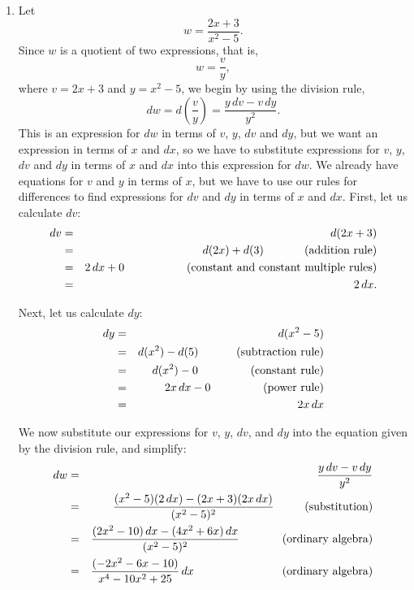 \documentclass[twoside,openright]{article}
\begin{document}
\begin{enumerate}
\item 
Let 
$$w = \frac{2x + 3}{x^2 - 5}.$$
Since $w$ is a quotient of two expressions, that is, 
$$w = \frac{v}{y},$$
where $v= 2x+3$ and $y = x^2 - 5$, we begin by using the division rule,
$$ dw = d\left(\frac{v}{y}\right) = \frac{y\,dv - v\,dy}{y^2}.$$
This is an expression for $dw$ in terms of $v$, $y$, $dv$ and $dy$,
but we want an expression in terms of $x$ and $dx$, so we have to
substitute expressions for $v$, $y$, $dv$ and $dy$ in terms of $x$ and
$dx$ into this expression for $dw$.  We already have equations for $v$
and $y$ in terms of $x$, but we have to use our rules for differences
to find expressions for $dv$ and $dy$ in terms of $x$ and $dx$.
First, let us calculate $dv$:
\begin{eqnarray*}
dv & = & d(2x + 3) \\
 & = & d(2x) + d(3) \mbox{\hspace{7.55ex} (addition rule)}\\
 & = & 2\,dx + 0 \mbox{\hspace{12ex} (constant and constant multiple rules)}\\
 & = & 2\,dx.
 \end{eqnarray*}
 
 Next, let us calculate $dy$:
 \begin{eqnarray*}
dy & = & d(x^2 - 5) \\
 & = & d(x^2) - d(5)  \mbox{\hspace{7ex} (subtraction rule)}\\
 & = & d(x^2) - 0 \mbox{\hspace{10ex} (constant rule)}\\
 & = & 2x\,dx -0 \mbox{\hspace{10ex} (power rule)}\\
 & = & 2x\,dx
 \end{eqnarray*}
 
 We now substitute our expressions for $v$, $y$, $dv$, and $dy$ into the equation given by the division rule, and simplify:
\begin{eqnarray*}
dw &  =  &  \frac{y\,dv - v\,dy}{y^2} \\
& = & \frac{(x^2-5)(2\,dx) - (2x+3)(2x\,dx)}{(x^2 - 5)^2} \mbox{\hspace{5.5ex} (substitution)}\\
& = & \frac{(2x^2 -10)\,dx - (4x^2 + 6x)\,dx}{(x^2 - 5)^2} \mbox{\hspace{8ex} (ordinary algebra)}\\
& = & \frac{(-2x^2 - 6x -10)}{x^4 -10x^2 + 25}\,dx \mbox{\hspace{18.1ex}(ordinary algebra)}
\end{eqnarray*}


\end{enumerate}
\end{document}
